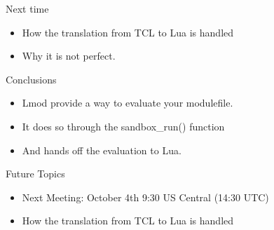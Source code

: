 \documentclass{beamer}
\begin{document}
\begin{frame}{Next time}
  \begin{itemize}
    \item How the translation from TCL to Lua is handled
    \item Why it is not perfect.
  \end{itemize}
\end{frame}

\begin{frame}{Conclusions}
  \begin{itemize}
    \item Lmod provide a way to evaluate your modulefile.
    \item It does so through the sandbox\_run() function
    \item And hands off the evaluation to Lua.
  \end{itemize}
\end{frame}

\begin{frame}{Future Topics}
  \begin{itemize}
    \item Next Meeting: October 4th 9:30 US Central (14:30 UTC)
    \item How the translation from TCL to Lua is handled
  \end{itemize}
\end{frame}
\end{document}
